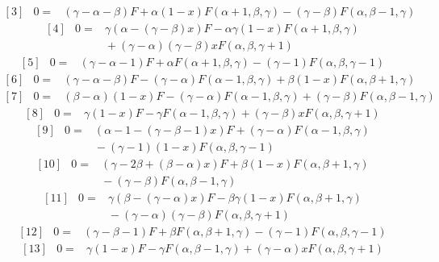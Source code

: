 \[
\begin{array}{rcl}
{[3]}&0=&(\gamma-\alpha-\beta)F+\alpha(1-x)F(\alpha+1,\beta,\gamma)-(\gamma-\beta)F(\alpha,\beta-1,\gamma)
\end{array}
\]
\[
\begin{array}{rcl}
{[4]}&0=&\gamma(\alpha-(\gamma-\beta)x)F-\alpha\gamma(1-x)F(\alpha+1,\beta,\gamma)\\
&&{}+(\gamma-\alpha)(\gamma-\beta)xF(\alpha,\beta,\gamma+1)
\end{array}
\]
\[
\begin{array}{rcl}
{[5]}&0=&(\gamma-\alpha-1)F+\alpha F(\alpha+1,\beta,\gamma)-(\gamma-1)F(\alpha,\beta,\gamma-1)
\end{array}
\]
\[
\begin{array}{rcl}
{[6]}&0=&(\gamma-\alpha-\beta)F-(\gamma-\alpha)F(\alpha-1,\beta,\gamma)+\beta(1-x)F(\alpha,\beta+1,\gamma)
\end{array}
\]
\[
\begin{array}{rcl}
{[7]}&0=&(\beta-\alpha)(1-x)F-(\gamma-\alpha)F(\alpha-1,\beta,\gamma)+(\gamma-\beta)F(\alpha,\beta-1,\gamma)
\end{array}
\]
\[
\begin{array}{rcl}
{[8]}&0=&\gamma(1-x)F-\gamma F(\alpha-1,\beta,\gamma)+(\gamma-\beta)xF(\alpha,\beta,\gamma+1)
\end{array}
\]
\[
\begin{array}{rcl}
{[9]}&0=&(\alpha-1-(\gamma-\beta-1)x)F+(\gamma-\alpha)F(\alpha-1,\beta,\gamma)\\
&&{}-(\gamma-1)(1-x)F(\alpha,\beta,\gamma-1)
\end{array}
\]
\[
\begin{array}{rcl}
{[10]}&0=&(\gamma-2\beta+(\beta-\alpha)x)F+\beta(1-x)F(\alpha,\beta+1,\gamma)\\
&&{}-(\gamma-\beta)F(\alpha,\beta-1,\gamma)
\end{array}
\]
\[
\begin{array}{rcl}
{[11]}&0=&\gamma(\beta-(\gamma-\alpha)x)F-\beta\gamma(1-x)F(\alpha,\beta+1,\gamma)\\
&&{}-(\gamma-\alpha)(\gamma-\beta)F(\alpha,\beta,\gamma+1)
\end{array}
\]
\[
\begin{array}{rcl}
{[12]}&0=&(\gamma-\beta-1)F+\beta F(\alpha,\beta+1,\gamma)-(\gamma-1)F(\alpha,\beta,\gamma-1)
\end{array}
\]
\[
\begin{array}{rcl}
{[13]}&0=&\gamma(1-x)F-\gamma F(\alpha,\beta-1,\gamma)+(\gamma-\alpha)xF(\alpha,\beta,\gamma+1)
\end{array}
\]
